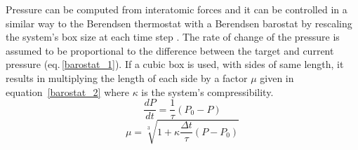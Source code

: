 Pressure can be computed from interatomic forces and it can be controlled in a similar way to the Berendsen thermostat with a Berendsen barostat by rescaling the system's box size at each time step \cite{Berendsen1984}. The rate of change of the pressure is assumed to be proportional to the difference between the target and current pressure (eq.\,\ref{barostat_1}). If a cubic box is used, with sides of same length, it results in multiplying the length of each side by a factor $\mu$ given in equation~\ref{barostat_2} where $\kappa$ is the system's compressibility. 
\begin{equation} \label{barostat_1}
    \frac{dP}{dt} = \frac{1}{\tau} ( P_0 - P )
\end{equation}
\begin{equation} \label{barostat_2}
    \mu = \sqrt[3]{1 + \kappa \frac{\Delta t}{\tau} \left(P - P_0 \right)}
\end{equation}



